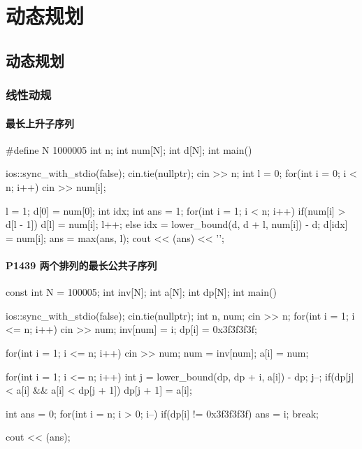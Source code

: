 \part{动态规划}

\chapter{动态规划}

\section{线性动规}
\subsection{最长上升子序列}\label{ux6700ux957fux4e0aux5347ux5b50ux5e8fux5217}






\begin{codeline}
#define N 1000005
int n;
int num[N];
int d[N];
int main() {
    ios::sync_with_stdio(false);
    cin.tie(nullptr);
    cin >> n;
    int l = 0;
    for(int i = 0; i < n; i++) {
        cin >> num[i];
    }

    l = 1;
    d[0] = num[0];
    int idx;
    int ans = 1;
    for(int i = 1; i < n; i++) {
        if(num[i] > d[l - 1]) {
            d[l] = num[i];
            l++;
        } else {
            idx = lower_bound(d, d + l, num[i]) - d;
            d[idx] = num[i];
        }
        ans = max(ans, l);
    }
    cout << (ans) << '\n';
}
\end{codeline}


\subsection{P1439 两个排列的最长公共子序列}\label{p1439-ux4e24ux4e2aux6392ux5217ux7684ux6700ux957fux516cux5171ux5b50ux5e8fux5217}






\begin{codeline}
const int N = 100005;
int inv[N];
int a[N];
int dp[N];
int main() {
    ios::sync_with_stdio(false);
    cin.tie(nullptr);
    int n, num;
    cin >> n;
    for(int i = 1; i <= n; i++) {
        cin >> num;
        inv[num] = i;
        dp[i] = 0x3f3f3f3f;
    }

    for(int i = 1; i <= n; i++) {
        cin >> num;
        num = inv[num];
        a[i] = num;
    }

    for(int i = 1; i <= n; i++) {
        int j = lower_bound(dp, dp + i, a[i]) - dp;
        j--;
        if(dp[j] < a[i] && a[i] < dp[j + 1]) {
            dp[j + 1] = a[i];
        }
    }

    int ans = 0;
    for(int i = n; i > 0; i--) {
        if(dp[i] != 0x3f3f3f3f) {
            ans = i;
            break;
        }
    }

    cout << (ans);
}
\end{codeline}



